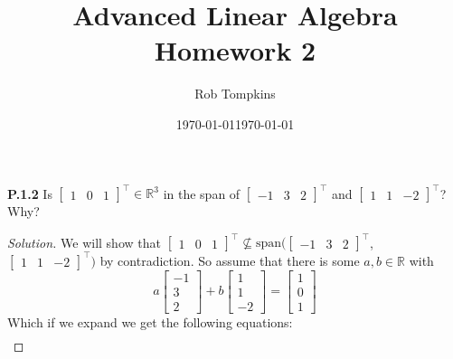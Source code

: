 \documentclass[12pt]{amsart}
\title{Advanced Linear Algebra\\Homework 2}
\author{Rob Tompkins}
\date{\today}
\newenvironment{solution}
{\begin{proof}[Solution]}
{\end{proof}}
\begin{document}
    \maketitle
    \date{\today}
    \begin{onehalfspace}

        \noindent\textbf{P.1.2} Is $[\begin{matrix}1 & 0 & 1\end{matrix}]^\top \in\mathbb{R}^3$ in the span of
        $[\begin{matrix}-1 & 3 & 2\end{matrix}]^\top$ and $[\begin{matrix} 1 & 1 & -2\end{matrix}]^\top$? Why?
        \begin{solution}
            We will show that $[\begin{matrix}1 & 0 & 1\end{matrix}]^\top
            \not\subseteq \text{span}([\begin{matrix}-1 & 3 & 2\end{matrix}]^\top$, $[\begin{matrix} 1 & 1 & -2\end{matrix}]^\top)$
            by contradiction. So assume that there is some $a,b\in\mathbb{R}$ with
            \begin{displaymath}
                a\left[\begin{matrix}
                           -1 \\
                           3 \\
                           2
                \end{matrix}\right] +
                b\left[\begin{matrix}
                          1 \\
                          1 \\
                          -2
                \end{matrix}\right] =
                \left[\begin{matrix}
                          1 \\
                          0 \\
                          1
                \end{matrix}\right]
            \end{displaymath}
            Which if we expand we get the following equations:
            \begin{eqnarray*}

\end{eqnarray*}
\end{solution}
\end{onehalfspace}
\end{document}
